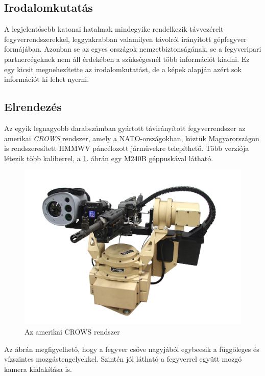 \documentclass[11pt,a4paper]{article}
\begin{document}
\pagebreak
\subsection{Irodalomkutatás}
A legjelentősebb katonai hatalmak mindegyike rendelkezik távvezérelt fegyverrendszerekkel, leggyakrabban valamilyen távolról irányított gépfegyver formájában. Azonban se az egyes országok nemzetbiztonságának, se a fegyveripari partnercégeknek nem áll érdekében a szükségesnél több információt kiadni. Ez egy kicsit megnehezítette az irodalomkutatást, de a képek alapján azért sok információt ki lehet nyerni.\\

\subsection{Elrendezés}

Az egyik legnagyobb darabszámban gyártott távirányított fegyverrendszer az amerikai \textsl{CROWS} rendszer, amely a NATO-országokban, köztük Magyarországon is rendszeresített HMMWV páncélozott járművekre telepíthető. Több verziója létezik több kaliberrel, a \ref{fig:irod_crows}. ábrán egy M240B géppuskával látható.

\begin{figure}[h!]
	\centering
	\includegraphics[width=1\linewidth]{irod_crows}
	\caption{Az amerikai CROWS rendszer}
	\label{fig:irod_crows}
\end{figure}

Az ábrán megfigyelhető, hogy a fegyver csöve nagyjából egybeesik a függőleges és vízszintes mozgástengelyekkel. Szintén jól látható a fegyverrel együtt mozgó kamera kialakítása is.\\
\end{document}
